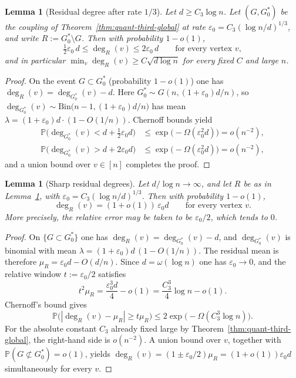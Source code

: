 \documentclass[11pt]{article}
\newtheorem{lemma}[theorem]{Lemma}
\newcommand{\PP}{\mathbb{P}}
\begin{document}
\begin{lemma}[Residual degree after rate \(1/3\)]
\label{lem:residual}
Let \(d\ge C_3\log n\).
Let \((G,G^*_0)\) be the coupling of Theorem~\ref{thm:quant-third-global} at rate
\(\varepsilon_0=C_3(\log n/d)^{1/3}\), and write \(R:=G^*_0\setminus G\).
Then with probability \(1-o(1)\),
\[
\tfrac12\varepsilon_0\,d
\le\deg_R(v)
\le 2\varepsilon_0\,d
\qquad\text{for every vertex \(v\)},
\]
and in particular \(\min_v\deg_R(v)\ge C\sqrt{d\log n}\) for every fixed \(C\) and large \(n\).
\end{lemma}

\begin{proof}
On the event \(G\subset G^*_0\) (probability \(1-o(1)\)) one has
\(\deg_R(v)=\deg_{G^*_0}(v)-d\).
Here \(G^*_0\sim G(n,(1+\varepsilon_0)d/n)\), so
\(\deg_{G^*_0}(v)\sim\mathrm{Bin}\bigl(n-1,(1+\varepsilon_0)d/n\bigr)\) has mean
\(\lambda=(1+\varepsilon_0)d\cdot(1-O(1/n))\).
Chernoff bounds yield
\begin{align*}
\PP\bigl(\deg_{G^*_0}(v)<d+\tfrac12\varepsilon_0 d\bigr)
&\le\exp\bigl(-\Omega(\varepsilon_0^2 d)\bigr)=o(n^{-2}),\\
\PP\bigl(\deg_{G^*_0}(v)>d+2\varepsilon_0 d\bigr)
&\le\exp\bigl(-\Omega(\varepsilon_0^2 d)\bigr)=o(n^{-2}),
\end{align*}
and a union bound over \(v\in[n]\) completes the proof.
\end{proof}

\begin{lemma}[Sharp residual degrees]
\label{lem:residual-sharp}
Let \(d/\log n\to\infty\), and let \(R\) be as in Lemma~\ref{lem:residual}, with
\(\varepsilon_0=C_3(\log n/d)^{1/3}\).
Then with probability \(1-o(1)\),
\[
\deg_R(v)=(1+o(1))\,\varepsilon_0 d
\qquad\text{for every vertex \(v\).}
\]
More precisely, the relative error may be taken to be \(\varepsilon_0/2\), which tends to \(0\).
\end{lemma}

\begin{proof}
On \(\{G\subset G^*_0\}\) one has \(\deg_R(v)=\deg_{G^*_0}(v)-d\), and
\(\deg_{G^*_0}(v)\) is binomial with mean
\(\lambda=(1+\varepsilon_0)d\,(1-O(1/n))\).
The residual mean is therefore
\(\mu_R=\varepsilon_0 d-O(d/n)\).
Since \(d=\omega(\log n)\) one has \(\varepsilon_0\to 0\), and the relative window
\(t:=\varepsilon_0/2\) satisfies
\[
t^2\mu_R
=\frac{\varepsilon_0^3 d}{4}-o(1)
=\frac{C_3^3}{4}\log n-o(1).
\]
Chernoff's bound gives
\[
\PP\bigl(|\deg_R(v)-\mu_R|\ge t\mu_R\bigr)
\le 2\exp\bigl(-\Omega(C_3^3\log n)\bigr).
\]
For the absolute constant \(C_3\) already fixed large by Theorem~\ref{thm:quant-third-global},
the right-hand side is \(o(n^{-2})\).
A union bound over \(v\), together with \(\PP(G\not\subset G^*_0)=o(1)\), yields
\(\deg_R(v)=(1\pm\varepsilon_0/2)\mu_R=(1+o(1))\varepsilon_0 d\) simultaneously for every \(v\).
\end{proof}
\end{document}
